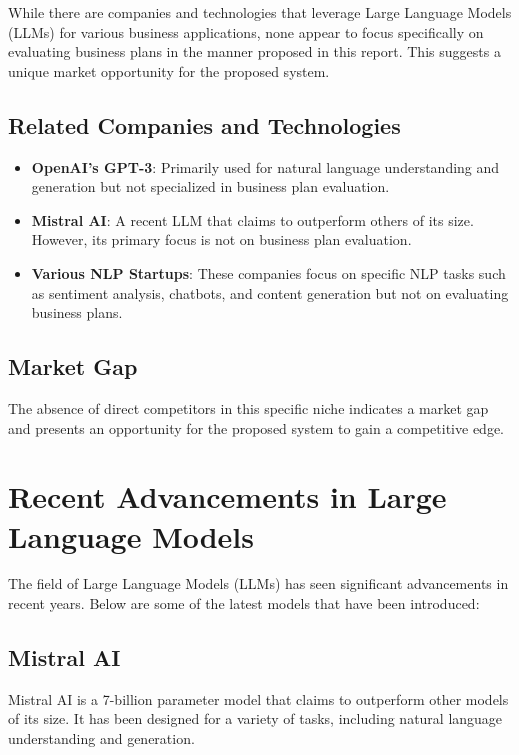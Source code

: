 \documentclass[12pt]{article}
\begin{document}
	While there are companies and technologies that leverage Large Language Models (LLMs) for various business applications, none appear to focus specifically on evaluating business plans in the manner proposed in this report. This suggests a unique market opportunity for the proposed system.
	
	\subsection{Related Companies and Technologies}
	\begin{itemize}
		\item \textbf{OpenAI's GPT-3}: Primarily used for natural language understanding and generation but not specialized in business plan evaluation\cite{openai}.
		\item \textbf{Mistral AI}: A recent LLM that claims to outperform others of its size. However, its primary focus is not on business plan evaluation\cite{mistral}.
		\item \textbf{Various NLP Startups}: These companies focus on specific NLP tasks such as sentiment analysis, chatbots, and content generation but not on evaluating business plans\cite{nlpstartups}.
	\end{itemize}
	
	\subsection{Market Gap}
	The absence of direct competitors in this specific niche indicates a market gap and presents an opportunity for the proposed system to gain a competitive edge.
	
	\section{Recent Advancements in Large Language Models}
	
	The field of Large Language Models (LLMs) has seen significant advancements in recent years. Below are some of the latest models that have been introduced:
	
	\subsection{Mistral AI}
	Mistral AI is a 7-billion parameter model that claims to outperform other models of its size. It has been designed for a variety of tasks, including natural language understanding and generation\cite{mistral7b}.
	
\end{document}

